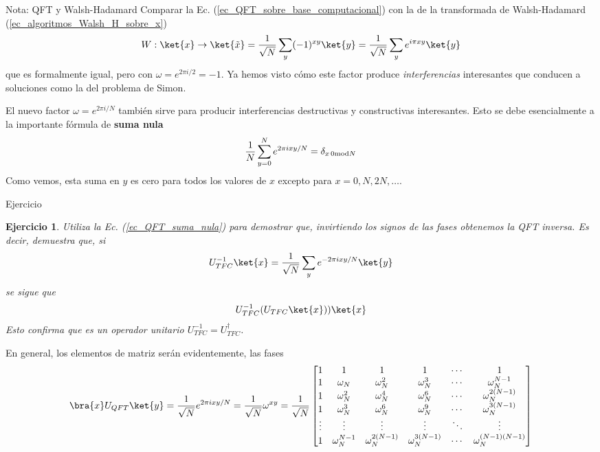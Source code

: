 \documentclass[a4paper,11pt]{book} %
\newtheorem{ejercicio_contador}{Ejercicio}
\newcommand{\Ejercicio}[1]{
		\begin{mybox_gray}{Ejercicio} 
			\begin{ejercicio_contador}
				 #1 
			\end{ejercicio_contador} 
		\end{mybox_gray}
	}
\numberwithin{equation}{chapter}
\begin{document}
	\begin{mybox_blue}{Nota: QFT y Walsh-Hadamard}
	Comparar la Ec. (\ref{ec_QFT_sobre_base_computacional}) con la de la transformada de Walsh-Hadamard (\ref{ec_algoritmos_Walsh_H_sobre_x})
	\begin{equation}
	W: \ket{x} \to \ket{\tilde x} =  \frac{1}{\sqrt{N}}\sum_{y}(-1)^{xy}\ket{y} =   \frac{1}{\sqrt{N}}\sum_{y} e^{i\pi   xy} \ket{y} 
	\end{equation}
	que es formalmente igual, pero con $\omega = e^{2\pi i/2} = -1$.
    Ya hemos visto cómo este factor produce \textit{interferencias} interesantes que conducen a soluciones como la del problema de Simon. 
	\end{mybox_blue}

El nuevo factor $\omega = e^{2\pi i/N}$ también sirve para producir interferencias destructivas y constructivas interesantes. Esto se debe esencialmente a la importante fórmula de \textbf{suma nula}
	\begin{equation} \label{ec_QFT_suma_nula}
	\frac{1}{N} \sum_{y=0}^{N} e^{2\pi i xy/N} = \delta_{x \, 0 {\rm mod}N}
	\end{equation}
Como vemos, esta suma en $y$ es cero para todos los valores de $x$ excepto para $x = 0, N, 2N, \dots$.

	\Ejercicio{
	Utiliza la Ec. (\ref{ec_QFT_suma_nula}) para demostrar que, invirtiendo los signos de las fases obtenemos la QFT inversa. Es decir, demuestra que, si  
	\begin{equation}
	U^{-1}_{TFC}\ket{x}  =  \frac{1}{\sqrt{N}}\sum_{y} e^{-2\pi i  xy /N} \ket{y} 
	\end{equation}
	se sigue que     
	\begin{equation}
	U_{TFC}^{-1}(U_{TFC} \ket{x}) ) \ket{x}
	\end{equation}
	Esto confirma que es un operador unitario $U_{TFC}^{-1} = U_{TFC}^\dagger$.
	}

En general, los elementos de matriz serán evidentemente, las fases
	\begin{equation*}
	\bra{x} U_{QFT} \ket{y} =  \frac{1}{\sqrt{N}} e^{2\pi i  x y/N} =\frac{1}{\sqrt{N}} \omega^{xy}
 = \frac{1}{\sqrt{N}} \begin{bmatrix}
1&1&1&1&\cdots &1 \\
1&\omega_N&\omega_N^2&\omega_N^3&\cdots&\omega_N^{N-1} \\
1&\omega_N^2&\omega_N^4&\omega_N^6&\cdots&\omega_N^{2(N-1)}\\ 1&\omega_N^3&\omega_N^6&\omega_N^9&\cdots&\omega_N^{3(N-1)}\\
\vdots&\vdots&\vdots&\vdots&\ddots&\vdots\\
1&\omega_N^{N-1}&\omega_N^{2(N-1)}&\omega_N^{3(N-1)}&\cdots&\omega_N^{(N-1)(N-1)}
\end{bmatrix}
	\end{equation*}
	
\end{document}
